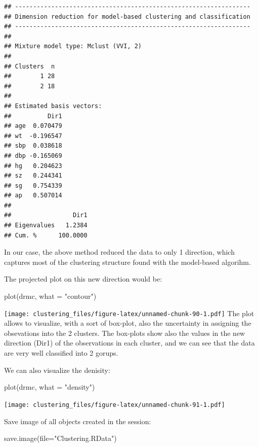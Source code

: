 \documentclass[
]{article}
\newenvironment{Shaded}{\begin{snugshade}}{\end{snugshade}}
\newcommand{\AttributeTok}[1]{\textcolor[rgb]{0.77,0.63,0.00}{#1}}
\newcommand{\FunctionTok}[1]{\textcolor[rgb]{0.00,0.00,0.00}{#1}}
\newcommand{\NormalTok}[1]{#1}
\newcommand{\StringTok}[1]{\textcolor[rgb]{0.31,0.60,0.02}{#1}}
\begin{document}
\begin{verbatim}
## ----------------------------------------------------------------- 
## Dimension reduction for model-based clustering and classification 
## ----------------------------------------------------------------- 
## 
## Mixture model type: Mclust (VVI, 2) 
##         
## Clusters  n
##        1 28
##        2 18
## 
## Estimated basis vectors: 
##          Dir1
## age  0.070479
## wt  -0.196547
## sbp  0.038618
## dbp -0.165069
## hg   0.204623
## sz   0.244341
## sg   0.754339
## ap   0.507014
## 
##                 Dir1
## Eigenvalues   1.2384
## Cum. %      100.0000
\end{verbatim}

In our case, the above method reduced the data to only 1 direction,
which captures most of the clustering structure found with the
model-based algorihm.

The projected plot on this new direction would be:

\begin{Shaded}
\begin{Highlighting}[]
\FunctionTok{plot}\NormalTok{(drmc, }\AttributeTok{what =} \StringTok{"contour"}\NormalTok{)}
\end{Highlighting}
\end{Shaded}

\texttt{[image: clustering\_files/figure-latex/unnamed-chunk-90-1.pdf]}
The plot allows to visualize, with a sort of box-plot, also the
uncertainty in assigning the obsevations into the 2 clusters. The
box-plots show also the values in the new direction (Dir1) of the
observations in each cluster, and we can see that the data are very well
classified into 2 gorups.

We can also visualize the denisity:

\begin{Shaded}
\begin{Highlighting}[]
\FunctionTok{plot}\NormalTok{(drmc, }\AttributeTok{what =} \StringTok{"density"}\NormalTok{)}
\end{Highlighting}
\end{Shaded}

\texttt{[image: clustering\_files/figure-latex/unnamed-chunk-91-1.pdf]}

Save image of all objects created in the session:

\begin{Shaded}
\begin{Highlighting}[]
\FunctionTok{save.image}\NormalTok{(}\AttributeTok{file=}\StringTok{"Clustering.RData"}\NormalTok{)}
\end{Highlighting}
\end{Shaded}
\end{document}
